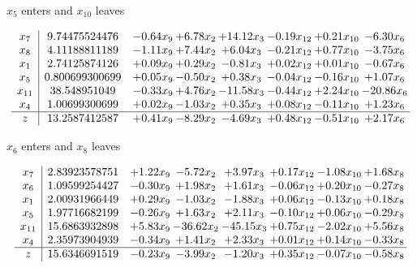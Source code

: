 \documentclass[8pt]{article}
\begin{document}
 $ x_{5} $ enters and $ x_{10} $ leaves 

 \[\begin{array}{c| c c@{\hskip 2pt} c@{\hskip 2pt} c@{\hskip 2pt} c@{\hskip 2pt} c@{\hskip 2pt} c@{\hskip 2pt} }
 x_{7}   &  9.74475524476 & -0.64 x_{9} & +  6.78 x_{2} & + 14.12 x_{3} & -0.19 x_{12} & +  0.21 x_{10} & -6.30 x_{6}\\
 x_{8}   &  4.11188811189 & -1.11 x_{9} & +  7.44 x_{2} & +  6.04 x_{3} & -0.21 x_{12} & +  0.77 x_{10} & -3.75 x_{6}\\
 x_{1}   &  2.74125874126 & +  0.09 x_{9} & +  0.29 x_{2} & -0.81 x_{3} & +  0.02 x_{12} & +  0.01 x_{10} & -0.67 x_{6}\\
 x_{5}   &  0.800699300699 & +  0.05 x_{9} & -0.50 x_{2} & +  0.38 x_{3} & -0.04 x_{12} & -0.16 x_{10} & +  1.07 x_{6}\\
 x_{11}   &  38.548951049 & -0.33 x_{9} & +  4.76 x_{2} & -11.58 x_{3} & -0.44 x_{12} & +  2.24 x_{10} & -20.86 x_{6}\\
 x_{4}   &  1.00699300699 & +  0.02 x_{9} & -1.03 x_{2} & +  0.35 x_{3} & +  0.08 x_{12} & -0.11 x_{10} & +  1.23 x_{6}\\
\hline
z    &  13.2587412587 & +  0.41 x_{9} & -8.29 x_{2} & -4.69 x_{3} & +  0.48 x_{12} & -0.51 x_{10} & +  2.17 x_{6}\\
\end{array}\]


 $ x_{6} $ enters and $ x_{8} $ leaves 

 \[\begin{array}{c| c c@{\hskip 2pt} c@{\hskip 2pt} c@{\hskip 2pt} c@{\hskip 2pt} c@{\hskip 2pt} c@{\hskip 2pt} }
 x_{7}   &  2.83923578751 & +  1.22 x_{9} & -5.72 x_{2} & +  3.97 x_{3} & +  0.17 x_{12} & -1.08 x_{10} & +  1.68 x_{8}\\
 x_{6}   &  1.09599254427 & -0.30 x_{9} & +  1.98 x_{2} & +  1.61 x_{3} & -0.06 x_{12} & +  0.20 x_{10} & -0.27 x_{8}\\
 x_{1}   &  2.00931966449 & +  0.29 x_{9} & -1.03 x_{2} & -1.88 x_{3} & +  0.06 x_{12} & -0.13 x_{10} & +  0.18 x_{8}\\
 x_{5}   &  1.97716682199 & -0.26 x_{9} & +  1.63 x_{2} & +  2.11 x_{3} & -0.10 x_{12} & +  0.06 x_{10} & -0.29 x_{8}\\
 x_{11}   &  15.6863932898 & +  5.83 x_{9} & -36.62 x_{2} & -45.15 x_{3} & +  0.75 x_{12} & -2.02 x_{10} & +  5.56 x_{8}\\
 x_{4}   &  2.35973904939 & -0.34 x_{9} & +  1.41 x_{2} & +  2.33 x_{3} & +  0.01 x_{12} & +  0.14 x_{10} & -0.33 x_{8}\\
\hline
z    &  15.6346691519 & -0.23 x_{9} & -3.99 x_{2} & -1.20 x_{3} & +  0.35 x_{12} & -0.07 x_{10} & -0.58 x_{8}\\
\end{array}\]
\end{document}
